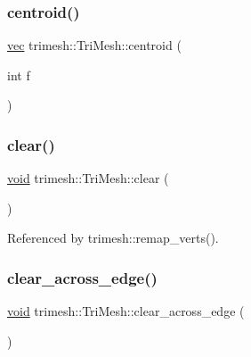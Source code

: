 \subsubsection{\texorpdfstring{centroid()}{centroid()}}
{\footnotesize\ttfamily \hyperlink{namespacetrimesh_a4fc2b83feba99c931f837a0c7d4b4df1}{vec} trimesh\+::\+Tri\+Mesh\+::centroid (\begin{DoxyParamCaption}\item[{int}]{f }\end{DoxyParamCaption})\hspace{0.3cm}{\ttfamily [inline]}}

\mbox{\label{classtrimesh_1_1TriMesh_aa2a446b6530bf915aea4464a65216656}} 
\subsubsection{\texorpdfstring{clear()}{clear()}}
{\footnotesize\ttfamily \hyperlink{namespacetrimesh_a784ddfd979e1c579bda795a8edfc3f43}{void} trimesh\+::\+Tri\+Mesh\+::clear (\begin{DoxyParamCaption}{ }\end{DoxyParamCaption})\hspace{0.3cm}{\ttfamily [inline]}}



Referenced by trimesh\+::remap\+\_\+verts().

\mbox{\label{classtrimesh_1_1TriMesh_ad51e9f5574e2fb77be1a1451bc98966d}} 
\subsubsection{\texorpdfstring{clear\+\_\+across\+\_\+edge()}{clear\_across\_edge()}}
{\footnotesize\ttfamily \hyperlink{namespacetrimesh_a784ddfd979e1c579bda795a8edfc3f43}{void} trimesh\+::\+Tri\+Mesh\+::clear\+\_\+across\+\_\+edge (\begin{DoxyParamCaption}{ }\end{DoxyParamCaption})\hspace{0.3cm}{\ttfamily [inline]}}



